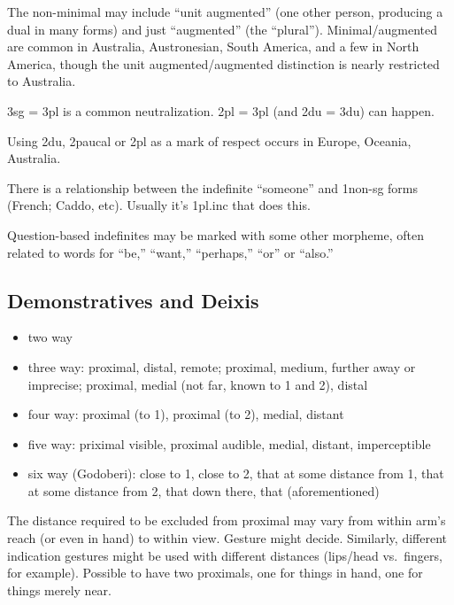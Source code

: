 \documentclass[11pt]{article}
\newenvironment{grammarlist}%
 {\begin{itemize}\addtolength{\itemsep}{-0.5\baselineskip}\ignorespaces}%
 {\end{itemize}\ignorespacesafterend}
\begin{document}
\noindent The non-minimal may include ``unit augmented'' (one other
person, producing a dual in many forms) and just ``augmented'' (the
``plural'').  Minimal/augmented are common in Australia, Austronesian,
South America, and a few in North America, though the unit
augmented/augmented distinction is nearly restricted to Australia.

3sg = 3pl is a common neutralization.  2pl = 3pl (and 2du = 3du) can
happen.

Using 2du, 2paucal or 2pl as a mark of respect occurs in Europe,
Oceania, Australia.

There is a relationship between the indefinite ``someone'' and
1non-sg forms (French; Caddo, etc).  Usually it's 1pl.inc that does
this. 

Question-based indefinites may be marked with some other morpheme,
often related to words for ``be,'' ``want,'' ``perhaps,'' ``or'' or
``also.''


\subsection{Demonstratives and Deixis}

\begin{grammarlist}
  \item two way
  \item three way: proximal, distal, remote; proximal, medium, further
    away or imprecise; proximal, medial (not far, known to 1 and 2),
    distal
  \item four way: proximal (to 1), proximal (to 2), medial, distant
  \item five way: priximal visible, proximal audible, medial, distant,
    imperceptible
  \item six way (Godoberi): close to 1, close to 2, that at some
    distance from 1, that at some distance from 2, that down there,
    that (aforementioned)
\end{grammarlist}

The distance required to be excluded from proximal may vary from
within arm's reach (or even in hand) to within view.  Gesture might
decide.  Similarly, different indication gestures might be used with
different distances (lips/head vs.\ fingers, for example).  Possible
to have two proximals, one for things in hand, one for things merely
near.
\end{document}
